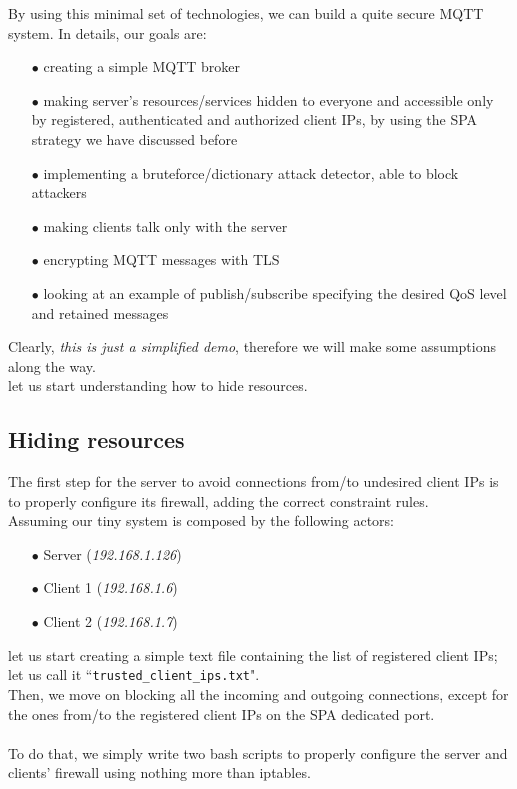 \documentclass[12pt]{report}
\begin{document}
{By using this minimal set of technologies, we can build a quite secure MQTT system. In details, our goals are:\bigskip
\begin{itemize}
\setlength{\itemindent}{+4mm}
\item[$\bullet$] creating a simple MQTT broker
\item[$\bullet$] making server's resources/services hidden to everyone and accessible only by registered, authenticated and authorized client IPs, by using the SPA strategy we have discussed before
\item[$\bullet$] implementing a bruteforce/dictionary attack detector, able to block attackers
\item[$\bullet$] making clients talk only with the server
\item[$\bullet$] encrypting MQTT messages with TLS
\item[$\bullet$] looking at an example of publish/subscribe specifying the desired QoS level and retained messages\\
\end{itemize}

Clearly, \emph{this is just a simplified demo}, therefore we will make some assumptions along the way.\\

let us start understanding how to hide resources.

\subsection{Hiding resources}
\bigskip
The first step for the server to avoid connections from/to undesired client IPs is to properly configure its firewall, adding the correct constraint rules.\\
Assuming our tiny system is composed by the following actors:
\bigskip
\begin{itemize}
\setlength{\itemindent}{+4mm}
\item[$\bullet$] Server (\emph{192.168.1.126})
\item[$\bullet$] Client 1 (\emph{192.168.1.6})
\item[$\bullet$] Client 2 (\emph{192.168.1.7})\\
\end{itemize}

let us start creating a simple text file containing the list of registered client IPs; let us call it ``\texttt{trusted\_client\_ips.txt}".\\
Then, we move on blocking all the incoming and outgoing connections, except for the ones from/to the registered client IPs on the SPA dedicated port.\\\\
To do that, we simply write two bash scripts to properly configure the server and clients' firewall using nothing more than iptables.

}
\end{document}
